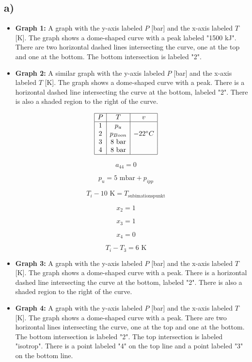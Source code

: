 

\subsection*{a)}

\begin{itemize}
    \item \textbf{Graph 1:} A graph with the y-axis labeled \( P \) [bar] and the x-axis labeled \( T \) [K]. The graph shows a dome-shaped curve with a peak labeled "1500 kJ". There are two horizontal dashed lines intersecting the curve, one at the top and one at the bottom. The bottom intersection is labeled "2".
    \item \textbf{Graph 2:} A similar graph with the y-axis labeled \( P \) [bar] and the x-axis labeled \( T \) [K]. The graph shows a dome-shaped curve with a peak. There is a horizontal dashed line intersecting the curve at the bottom, labeled "2". There is also a shaded region to the right of the curve.
\end{itemize}

\[
\begin{array}{|c|c|c|}
\hline
P & T & v \\
\hline
1 & p_u & \\
2 & p_{Boon} & -22^\circ C \\
3 & 8 \text{ bar} & \\
4 & 8 \text{ bar} & \\
\hline
\end{array}
\]

\[
a_{44} = 0
\]

\[
p_u = 5 \text{ mbar} + p_{ipp}
\]

\[
T_i - 10 \text{ K} = T_{\text{subimationspunkt}}
\]

\[
x_2 = 1
\]

\[
x_3 = 1
\]

\[
x_4 = 0
\]

\[
T_i - T_3 = 6 \text{ K}
\]

\begin{itemize}
    \item \textbf{Graph 3:} A graph with the y-axis labeled \( P \) [bar] and the x-axis labeled \( T \) [K]. The graph shows a dome-shaped curve with a peak. There is a horizontal dashed line intersecting the curve at the bottom, labeled "2". There is also a shaded region to the right of the curve.
    \item \textbf{Graph 4:} A graph with the y-axis labeled \( P \) [bar] and the x-axis labeled \( T \) [K]. The graph shows a dome-shaped curve with a peak. There are two horizontal lines intersecting the curve, one at the top and one at the bottom. The bottom intersection is labeled "2". The top intersection is labeled "isotrop". There is a point labeled "4" on the top line and a point labeled "3" on the bottom line.
\end{itemize}